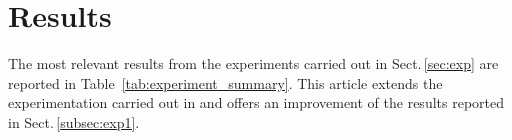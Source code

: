 
\section{Results }

The most relevant results from the experiments carried out in
Sect.\,\ref{sec:exp} are reported in Table~\ref{tab:experiment_summary}.
This article extends the experimentation carried out in \cite{Lemaintre2015miccaiOCT}
and offers an improvement of the results reported in Sect.\,\ref{subsec:exp1}.





